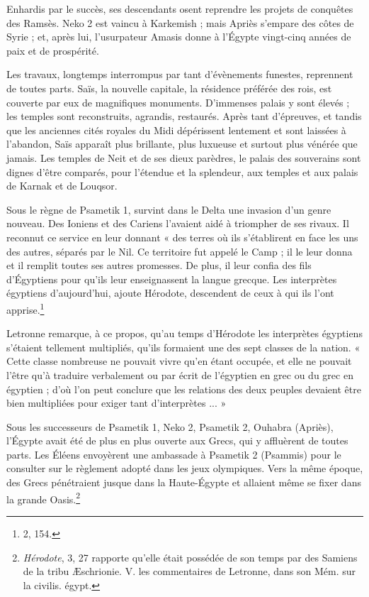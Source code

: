 \documentclass[a4paper, 11pt, oneside]{article}
\begin{document}
Enhardis par le succès, ses descendants osent reprendre les projets de conquêtes des Ramsès. Neko 2 est vaincu à Karkemish ; mais Apriès s'empare des côtes de Syrie ; et, après lui, l'usurpateur Amasis donne à l'Égypte vingt-cinq années de paix et de prospérité.

Les travaux, longtemps interrompus par tant d'évènements funestes, reprennent de toutes parts. Saïs, la nouvelle capitale, la résidence préférée des rois, est couverte par eux de magnifiques monuments. D'immenses palais y sont élevés ; les temples sont reconstruits, agrandis, restaurés. Après tant d'épreuves, et tandis que les anciennes cités royales du Midi dépérissent lentement et sont laissées à l'abandon, Saïs apparaît plus brillante, plus luxueuse et surtout plus vénérée que jamais. Les temples de Neit et de ses dieux parèdres, le palais des souverains sont dignes d'être comparés, pour l'étendue et la splendeur, aux temples et aux palais de Karnak et de Louqsor.

Sous le règne de Psametik 1, survint dans le Delta une invasion d'un genre nouveau. Des Ioniens et des Cariens l'avaient aidé à triompher de ses rivaux. Il reconnut ce service en leur donnant « des terres où ils s'établirent en face les uns des autres, séparés par le Nil. Ce territoire fut appelé le Camp ; il le leur donna et il remplit toutes ses autres promesses. De plus, il leur confia des fils d'Égyptiens pour qu'ils leur enseignassent la langue grecque. Les interprètes égyptiens d'aujourd’hui, ajoute Hérodote, descendent de ceux à qui ils l'ont apprise.\footnote{2, 154.}

Letronne remarque, à ce propos, qu'au temps d'Hérodote les interprètes égyptiens s'étaient tellement multipliés, qu'ils formaient une des sept classes de la nation. « Cette classe nombreuse ne pouvait vivre qu'en étant occupée, et elle ne pouvait l'être qu'à traduire verbalement ou par écrit de l'égyptien en grec ou du grec en égyptien ; d'où l'on peut conclure que les relations des deux peuples devaient être bien multipliées pour exiger tant d'interprètes ... »

Sous les successeurs de Psametik 1, Neko 2, Psametik 2, Ouhabra (Apriès), l'Égypte avait été de plus en plus ouverte aux Grecs, qui y affluèrent de toutes parts. Les Éléens envoyèrent une ambassade à Psametik 2 (Psammis) pour le consulter sur le règlement adopté dans les jeux olympiques. Vers la même époque, des Grecs pénétraient jusque dans la Haute-Égypte et allaient même se fixer dans la grande Oasis.\footnote{\emph{Hérodote}, 3, 27 rapporte qu'elle était possédée de son temps par des Samiens de la tribu Æschrionie. V. les commentaires de Letronne, dans son Mém. sur la civilis. égypt.}
\end{document}
